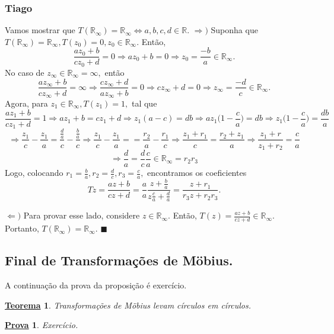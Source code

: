 \documentclass{article}
\newtheorem*{theorem*}{\underline{Teorema}}
\newtheorem*{proof*}{\underline{Prova}}
\renewcommand\qedsymbol{$\blacksquare$}
\begin{document}
  \subsubsection{Tiago}
  Vamos mostrar que $T(\mathbb{R}_\infty) = \mathbb{R}_{\infty}\Longleftrightarrow a, b, c, d\in \mathbb{R}$.
  $\Rightarrow)$ Suponha que $T(\mathbb{R}_\infty) = \mathbb{R}_\infty, T(z_{0}) = 0, z_{0}\in \mathbb{R}_\infty.$ Ent\~ao,
  $$
  \frac{az_{0} + b}{cz_{0} + d} = 0\Rightarrow az_{0} + b = 0\Rightarrow z_{0} = \frac{-b}{a}\in \mathbb{R}_\infty. 
  $$
  No caso de $z_\infty \in \mathbb{R}_\infty = \infty, $ ent\~ao
  $$
  \frac{az_{\infty} + b}{cz_{\infty} + d} = \infty\Rightarrow \frac{cz_{\infty} + d}{az_{\infty} + b} = 0\Rightarrow cz_\infty + d = 0
  \Rightarrow z_\infty = \frac{-d}{c}\in \mathbb{R}_\infty.
  $$
  Agora, para $z_{1}\in \mathbb{R}_{\infty}, T(z_{1}) = 1,$ tal que 
  $$
  \frac{az_{1} + b}{cz_{1} + d} = 1\Rightarrow az_{1} + b = cz_{1} + d\Rightarrow z_{1}(a - c) = db\Rightarrow az_{1}\biggl(1 - \frac{c}{a}\biggr) = db
  \Rightarrow z_{1}\biggl(1 - \frac{c}{a}\biggr) = \frac{db}{a}
  $$
  $$
  \Rightarrow \frac{z_{1}}{c} - \frac{z_1}{a} = \frac{\frac{d}{a}}{c} - \frac{\frac{b}{a}}{c}\Rightarrow \frac{z_1}{c} - \frac{z_1}{a} =
  = \frac{r_2}{a} - \frac{r_1}{c}\Rightarrow \frac{z_1 + r_1}{c} = \frac{r_2 + z_1}{a}\Rightarrow \frac{z_1 + r}{z_1 + r_2} = \frac{c}{a}
  $$
  $$
  \Rightarrow \frac{d}{a} = \frac{d}{c}\frac{c}{a}\in \mathbb{R}_{\infty} = r_2r_3
  $$
  Logo, colocando $r_{1} = \frac{b}{a}, r_2 = \frac{d}{c}, r_3 = \frac{c}{a},$ encontramos os coeficientes
  $$
  Tz = \frac{az + b}{cz + d} = \frac{a}{a}\frac{z + \frac{b}{a}}{z \frac{c}{a} + \frac{d}{a}} = \frac{z + r_1}{r_3z + r_2r_3}.
  $$

  $\Leftarrow)$ Para provar esse lado, considere $z\in \mathbb{R}_\infty.$ Ent\~ao, $T(z) = \frac{az + b}{cz + d}\in \mathbb{R}_\infty.$ Portanto,
  $T(\mathbb{R}_\infty) = \mathbb{R}_\infty.$  \qedsymbol

  \subsection{Final de Transforma\c c\~oes de M\"{o}bius.}
  A continua\c c\~ao da prova da proposi\c c\~ao \'e exerc\'icio.
  \begin{theorem*}
    Transforma\c c\~oes de M\"{o}bius levam c\'irculos em c\'irculos.
  \end{theorem*}
  \begin{proof*}
    Exerc\'icio.
  \end{proof*}
\end{document}
